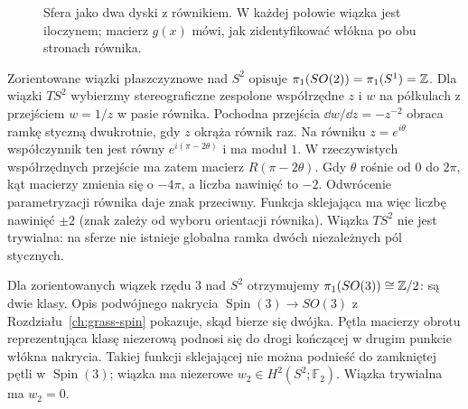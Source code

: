 \begin{figure}[H]
\centering
{}
\caption{Sfera jako dwa dyski z równikiem.
W każdej połowie wiązka jest iloczynem;
macierz $g(x)$ mówi, jak zidentyfikować
włókna po obu stronach równika.}
\label{fig:clutching-16}
\end{figure}

\begin{przyklad}
Zorientowane wiązki płaszczyznowe
nad $S^2$ opisuje
$\pi_1(SO(2))=\pi_1(S^1)=\mathbb{Z}$.
Dla wiązki $TS^2$ wybierzmy
stereograficzne zespolone
współrzędne $z$ i $w$
na półkulach z przejściem
$w=1/z$ w pasie równika.
Pochodna przejścia
$\dd w/\dd z=-z^{-2}$
obraca ramkę styczną
dwukrotnie, gdy $z$
okrąża równik raz.
Na równiku $z=e^{i\theta}$ współczynnik ten jest równy
$e^{i(\pi-2\theta)}$ i ma moduł $1$.
W rzeczywistych współrzędnych przejście ma zatem macierz
$R(\pi-2\theta)$.
Gdy $\theta$ rośnie od $0$ do $2\pi$, kąt macierzy
zmienia się o $-4\pi$, a liczba nawinięć to $-2$.
Odwrócenie parametryzacji równika daje znak przeciwny.
Funkcja sklejająca ma
więc liczbę nawinięć
$\pm2$ (znak zależy
od wyboru orientacji
równika). Wiązka $TS^2$
nie jest trywialna:
na sferze nie istnieje
globalna ramka dwóch
niezależnych pól stycznych.
\end{przyklad}

\begin{przyklad}
Dla zorientowanych wiązek
rzędu $3$ nad $S^2$
otrzymujemy
$\pi_1(SO(3))\cong\mathbb{Z}/2$:
są dwie klasy.
Opis podwójnego nakrycia
$\operatorname{Spin}(3)\to SO(3)$
z Rozdziału~\ref{ch:grass-spin}
pokazuje, skąd bierze się
dwójka. Pętla macierzy
obrotu reprezentująca
klasę niezerową podnosi
się do drogi kończącej
w drugim punkcie włókna
nakrycia. Takiej
funkcji sklejającej
nie można podnieść
do zamkniętej pętli
w $\operatorname{Spin}(3)$;
wiązka ma niezerowe
$w_2\in H^2(S^2;\mathbb F_2)$.
Wiązka trywialna ma
$w_2=0$.
\end{przyklad}


